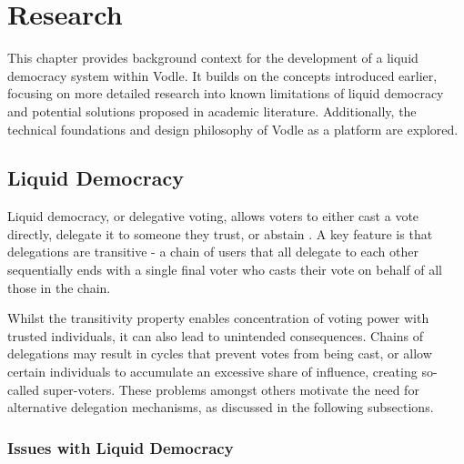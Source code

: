 \chapter{Research}
\label{ch:background}

This chapter provides background context for the development of a liquid democracy system within Vodle. It builds on the concepts introduced earlier, focusing on more detailed research into known limitations of liquid democracy and potential solutions proposed in academic literature. Additionally, the technical foundations and design philosophy of Vodle as a platform are explored.

\section{Liquid Democracy}

Liquid democracy, or delegative voting, allows voters to either cast a vote directly, delegate it to someone they trust, or abstain \citep{blum_liquid_2016}. A key feature is that delegations are transitive - a chain of users that all delegate to each other sequentially ends with a single final voter who casts their vote on behalf of all those in the chain.

Whilst the transitivity property enables concentration of voting power with trusted individuals, it can also lead to unintended consequences. Chains of delegations may result in cycles that prevent votes from being cast, or allow certain individuals to accumulate an excessive share of influence, creating so-called super-voters. These problems amongst others motivate the need for alternative delegation mechanisms, as discussed in the following subsections.


\subsection{Issues with Liquid Democracy}

